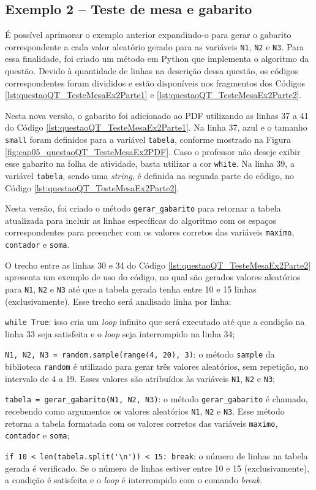 \subsection{Exemplo 2 -- Teste de mesa e gabarito}

É possível aprimorar o exemplo anterior expandindo-o para gerar o gabarito correspondente a cada valor aleatório gerado para as variáveis \verb|N1|, \verb|N2| e \verb|N3|. Para essa finalidade, foi criado um método em Python que implementa o algoritmo da questão. Devido à quantidade de linhas na descrição dessa questão, os códigos correspondentes foram divididos e estão disponíveis nos fragmentos dos Códigos \ref{lst:questaoQT_TesteMesaEx2Parte1} e  \ref{lst:questaoQT_TesteMesaEx2Parte2}.

Nesta nova versão, o gabarito foi adicionado ao PDF utilizando as linhas 37 a 41 do Código \ref{lst:questaoQT_TesteMesaEx2Parte1}. Na linha 37, azul e o tamanho \verb|small| foram definidos para a variável \verb|tabela|, conforme mostrado na Figura \ref{fig:cap05_questaoQT_TesteMesaEx2PDF}. Caso o professor não deseje exibir esse gabarito na folha de atividade, basta utilizar a cor \verb|white|. Na linha 39, a variável \verb|tabela|, sendo uma \textit{string}, é definida na segunda parte do código, no Código \ref{lst:questaoQT_TesteMesaEx2Parte2}.

Nesta versão, foi criado o método \verb|gerar_gabarito| para retornar a tabela atualizada para incluir as linhas específicas do algoritmo com os espaços correspondentes para preencher com os valores corretos das variáveis \verb|maximo|, \verb|contador| e \verb|soma|. 

O trecho entre as linhas 30 e 34 do Código \ref{lst:questaoQT_TesteMesaEx2Parte2} apresenta um exemplo de uso do código, no qual são gerados valores aleatórios para \verb|N1|, \verb|N2| e \verb|N3| até que a tabela gerada tenha entre 10 e 15 linhas (exclusivamente). Esse trecho será analisado linha por linha:

\begin{description}
  \item \verb|while True|: isso cria um \textit{loop} infinito que será executado até que a condição na linha 33 seja satisfeita e o \textit{loop} seja interrompido na linha 34;
  \item \verb|N1, N2, N3 = random.sample(range(4, 20), 3)|: o método \verb|sample| da biblioteca \verb|random| é utilizado para gerar três valores aleatórios, sem repetição, no intervalo de 4 a 19. Esses valores são atribuídos às variáveis \verb|N1|, \verb|N2| e \verb|N3|;
  \item \verb|tabela = gerar_gabarito(N1, N2, N3)|: o método \verb|gerar_gabarito| é chamado, recebendo como argumentos os valores aleatórios \verb|N1|, \verb|N2| e \verb|N3|. Esse método retorna a tabela formatada com os valores corretos das variáveis \verb|maximo|, \verb|contador| e \verb|soma|;
  \item \verb|if 10 < len(tabela.split('\n')) < 15: break|: o número de linhas na tabela gerada é verificado. Se o número de linhas estiver entre 10 e 15 (exclusivamente), a condição é satisfeita e o \textit{loop} é interrompido com o comando \textit{break}.
\end{description}



